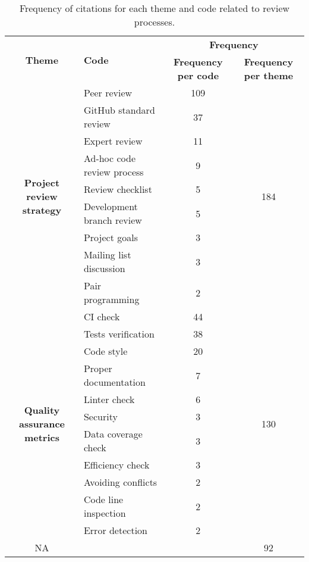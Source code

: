 	\begin{table}
		\centering
		\caption{Frequency of citations for each theme and code related to review processes.}
		\begin{tabular}{cp{13.0em}cc}
			\hline
			\multicolumn{1}{c}{\multirow{2}[4]{*}{\textbf{Theme}}} & \multirow{2}[4]{*}{\textbf{Code}} & \multicolumn{2}{p{10em}}{\textbf{Frequency}} \bigstrut\\
			\cline{3-4}          & \multicolumn{1}{c}{} & \multicolumn{1}{p{5em}}{\textbf{Frequency per code}} & \multicolumn{1}{p{5em}}{\textbf{Frequency per theme}} \bigstrut\\
			\hline
			\multicolumn{1}{c}{\multirow{9}[18]{*}{\parbox{3cm}{\centering \textbf{Project review strategy}}}} & Peer review & 109   & \multirow{9}[18]{*}{184} \bigstrut\\
			\cline{2-3}          & GitHub standard review & 37    &  \bigstrut\\
			\cline{2-3}          & Expert review & 11    &  \bigstrut\\
			\cline{2-3}          & Ad-hoc code review process & 9     &  \bigstrut\\
			\cline{2-3}          & Review checklist & 5     &  \bigstrut\\
			\cline{2-3}          & Development branch review & 5     &  \bigstrut\\
			\cline{2-3}          & Project goals & 3     &  \bigstrut\\
			\cline{2-3}          & Mailing list discussion & 3     &  \bigstrut\\
			\cline{2-3}          & Pair programming & 2     &  \bigstrut\\

			\hline
			\multicolumn{1}{c}{\multirow{11}[22]{*}{\parbox{3cm}{\centering \textbf{Quality assurance metrics}}}} & CI check & 44    & \multirow{11}[22]{*}{130} \bigstrut\\
			\cline{2-3}          & Tests verification & 38    &  \bigstrut\\
			\cline{2-3}          & Code style & 20    &  \bigstrut\\
			\cline{2-3}          & Proper documentation & 7     &  \bigstrut\\
			\cline{2-3}          & Linter check & 6     &  \bigstrut\\
			\cline{2-3}          & Security & 3     &  \bigstrut\\
			\cline{2-3}          & Data coverage check & 3     &  \bigstrut\\
			\cline{2-3}          & Efficiency check & 3     &  \bigstrut\\
			\cline{2-3}          & Avoiding conflicts & 2     &  \bigstrut\\
			\cline{2-3}          & Code line inspection & 2     &  \bigstrut\\
			\cline{2-3}          & Error detection & 2     &  \bigstrut\\
			\hline
			NA    &     &     & 92 \bigstrut\\
			\hline
		\end{tabular}%
		\label{tab:projects_reviewing_process}%
	\end{table}%

